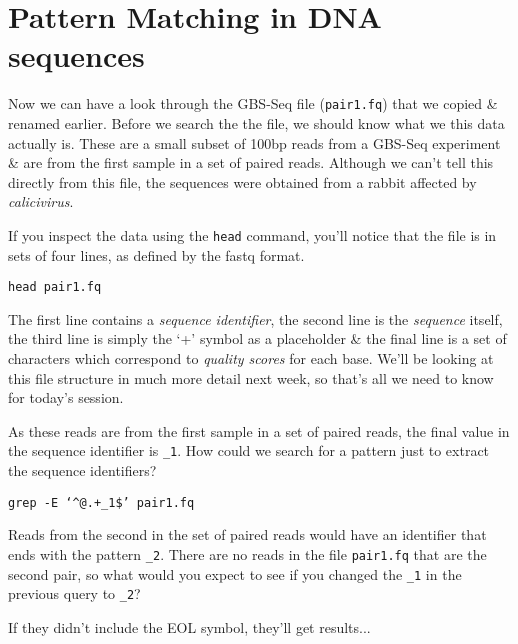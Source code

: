 \section{Pattern Matching in DNA sequences}
\begin{information}
Now we can have a look through the GBS-Seq file (\texttt{pair1.fq}) that we copied \& renamed earlier.
Before we search the the file, we should know what we this data actually is.
These are a small subset of 100bp reads from a GBS-Seq experiment \& are from the first sample in a set of paired reads.
Although we can't tell this directly from this file, the sequences were obtained from a rabbit affected by \textit{calicivirus}.
\end{information}

\begin{steps}
If you inspect the data using the \texttt{head} command, you'll notice that the file is in sets of four lines, as defined by the fastq format.
\begin{lstlisting}
head pair1.fq
\end{lstlisting}
The first line contains a \textit{sequence identifier}, the second line is the \textit{sequence} itself, the third line is simply the `+' symbol as a placeholder \& the final line is a set of characters which correspond to \textit{quality scores} for each base.
We'll be looking at this file structure in much more detail next week, so that's all we need to know for today's session.
\end{steps}

\begin{questions}
As these reads are from the first sample in a set of paired reads, the final value in the sequence identifier is \texttt{\_1}.
How could we search for a pattern just to extract the sequence identifiers? \\
\begin{answer}
\texttt{grep -E `\^{}@.+\_1\$' pair1.fq}
\end{answer}

Reads from the second in the set of paired reads would have an identifier that ends with the pattern \texttt{\_2}.
There are no reads in the file \texttt{pair1.fq} that are the second pair, so what would you expect to see if you changed the \texttt{\_1} in the previous query to \texttt{\_2}? \\
\begin{answer}
If they didn't include the EOL symbol, they'll get results...
\end{answer}

\end{questions}

